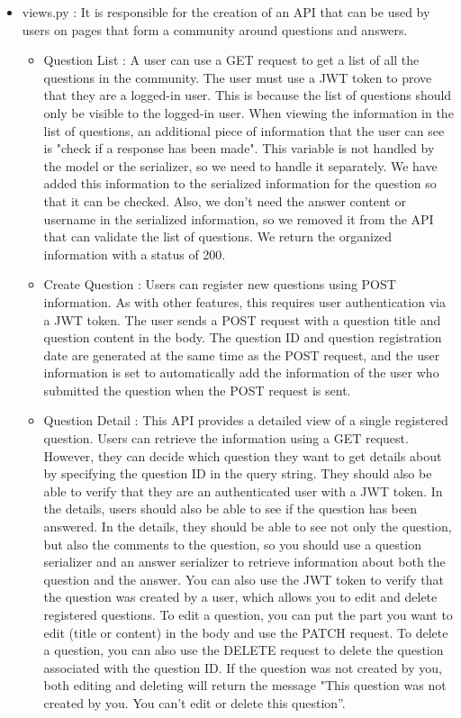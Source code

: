 \documentclass[conference, a4paper]{IEEEtran}
\begin{document}
\begin{enumerate}
\begin{itemize}
\begin{itemize}
        \item views.py : It is responsible for the creation of an API that can be used by users on pages that form a community around questions and answers.
        \begin{itemize}
            \item Question List : A user can use a GET request to get a list of all the questions in the community. The user must use a JWT token to prove that they are a logged-in user. This is because the list of questions should only be visible to the logged-in user. When viewing the information in the list of questions, an additional piece of information that the user can see is "check if a response has been made". This variable is not handled by the model or the serializer, so we need to handle it separately. We have added this information to the serialized information for the question so that it can be checked. Also, we don't need the answer content or username in the serialized information, so we removed it from the API that can validate the list of questions. We return the organized information with a status of 200. \\
            \item Create Question : Users can register new questions using POST information. As with other features, this requires user authentication via a JWT token. The user sends a POST request with a question title and question content in the body. The question ID and question registration date are generated at the same time as the POST request, and the user information is set to automatically add the information of the user who submitted the question when the POST request is sent.\\
            \item Question Detail : This API provides a detailed view of a single registered question. Users can retrieve the information using a GET request. However, they can decide which question they want to get details about by specifying the question ID in the query string. They should also be able to verify that they are an authenticated user with a JWT token. In the details, users should also be able to see if the question has been answered. In the details, they should be able to see not only the question, but also the comments to the question, so you should use a question serializer and an answer serializer to retrieve information about both the question and the answer. You can also use the JWT token to verify that the question was created by a user, which allows you to edit and delete registered questions. To edit a question, you can put the part you want to edit (title or content) in the body and use the PATCH request. To delete a question, you can also use the DELETE request to delete the question associated with the question ID. If the question was not created by you, both editing and deleting will return the message "This question was not created by you. You can't edit or delete this question”. \\

\end{itemize}
\end{itemize}
\end{itemize}
\end{enumerate}
\end{document}
